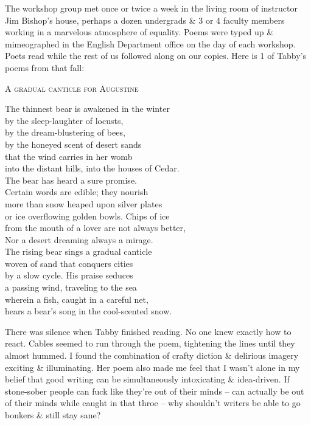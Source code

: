 \documentclass{article}
\numberwithin{equation}{section}
\begin{document}
The workshop group met once or twice a week in the living room of instructor Jim Bishop's house, perhaps a dozen undergrads \& 3 or 4 faculty members working in a marvelous atmosphere of equality. Poems were typed up \& mimeographed in the English Department office on the day of each workshop. Poets read while the rest of us followed along on our copies. Here is 1 of Tabby's poems from that fall:
\begin{center}
	\textsc{A gradual canticle for Augustine}
	
	The thinnest bear is awakened in the winter\\by the sleep-laughter of locusts,\\by the dream-blustering of bees,\\by the honeyed scent of desert sands\\that the wind carries in her womb\\into the distant hills, into the houses of Cedar.\\The bear has heard a sure promise.\\Certain words are edible; they nourish\\more than snow heaped upon silver plates\\or ice overflowing golden bowls. Chips of ice\\from the mouth of a lover are not always better,\\Nor a desert dreaming always a mirage.\\The rising bear sings a gradual canticle\\woven of sand that conquers cities\\by a slow cycle. His praise seduces\\a passing wind, traveling to the sea\\wherein a fish, caught in a careful net,\\hears a bear's song in the cool-scented snow.
\end{center}
There was silence when Tabby finished reading. No one knew exactly how to react. Cables seemed to run through the poem, tightening the lines until they almost hummed. I found the combination of crafty diction \& delirious imagery exciting \& illuminating. Her poem also made me feel that I wasn't alone in my belief that good writing can be simultaneously intoxicating \& idea-driven. If stone-sober people can fuck like they're out of their minds -- can actually be out of their minds while caught in that throe -- why shouldn't writers be able to go bonkers \& still stay sane?
\end{document}
